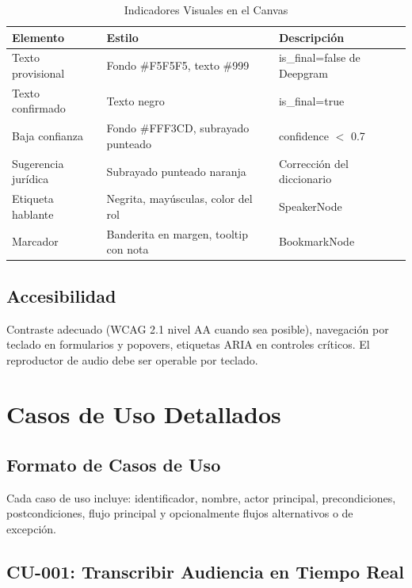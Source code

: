 \documentclass[12pt,a4paper]{report}
\begin{document}
\begin{table}[H]
\centering
\small
\begin{tabular}{|p{3.5cm}|p{3cm}|p{6.5cm}|}
\hline
\rowcolor{primaryblue!20}
\textbf{Elemento} & \textbf{Estilo} & \textbf{Descripción} \\
\hline
Texto provisional & Fondo \#F5F5F5, texto \#999 & is\_final=false de Deepgram \\
\hline
Texto confirmado & Texto negro & is\_final=true \\
\hline
Baja confianza & Fondo \#FFF3CD, subrayado punteado & confidence $<$ 0.7 \\
\hline
Sugerencia jurídica & Subrayado punteado naranja & Corrección del diccionario \\
\hline
Etiqueta hablante & Negrita, mayúsculas, color del rol & SpeakerNode \\
\hline
Marcador & Banderita en margen, tooltip con nota & BookmarkNode \\
\hline
\end{tabular}
\caption{Indicadores Visuales en el Canvas}
\end{table}

\section{Accesibilidad}

Contraste adecuado (WCAG 2.1 nivel AA cuando sea posible), navegación por teclado en formularios y popovers, etiquetas ARIA en controles críticos. El reproductor de audio debe ser operable por teclado.

\chapter{Casos de Uso Detallados}

\section{Formato de Casos de Uso}

Cada caso de uso incluye: identificador, nombre, actor principal, precondiciones, postcondiciones, flujo principal y opcionalmente flujos alternativos o de excepción.

\section{CU-001: Transcribir Audiencia en Tiempo Real}
\end{document}
